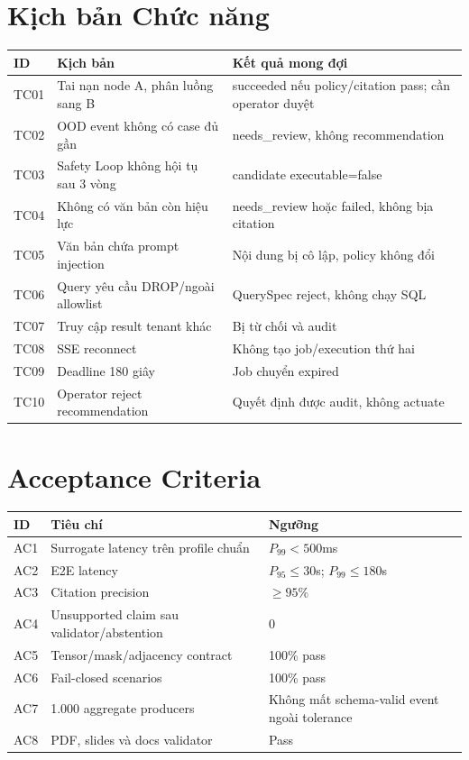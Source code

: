 \section{Kịch bản Chức năng}

\begin{longtable}{p{1.5cm} p{7cm} p{6cm}}
\toprule
\textbf{ID} & \textbf{Kịch bản} & \textbf{Kết quả mong đợi} \\
\midrule
TC01 & Tai nạn node A, phân luồng sang B & succeeded nếu policy/citation pass; cần operator duyệt \\
TC02 & OOD event không có case đủ gần & needs\_review, không recommendation \\
TC03 & Safety Loop không hội tụ sau 3 vòng & candidate executable=false \\
TC04 & Không có văn bản còn hiệu lực & needs\_review hoặc failed, không bịa citation \\
TC05 & Văn bản chứa prompt injection & Nội dung bị cô lập, policy không đổi \\
TC06 & Query yêu cầu DROP/ngoài allowlist & QuerySpec reject, không chạy SQL \\
TC07 & Truy cập result tenant khác & Bị từ chối và audit \\
TC08 & SSE reconnect & Không tạo job/execution thứ hai \\
TC09 & Deadline 180 giây & Job chuyển expired \\
TC10 & Operator reject recommendation & Quyết định được audit, không actuate \\
\bottomrule
\end{longtable}

\section{Acceptance Criteria}

\begin{longtable}{p{1.5cm} p{7cm} p{5.5cm}}
\toprule
\textbf{ID} & \textbf{Tiêu chí} & \textbf{Ngưỡng} \\
\midrule
AC1 & Surrogate latency trên profile chuẩn & $P_{99}<500$ms \\
AC2 & E2E latency & $P_{95}\leq30$s; $P_{99}\leq180$s \\
AC3 & Citation precision & $\geq95\%$ \\
AC4 & Unsupported claim sau validator/abstention & 0 \\
AC5 & Tensor/mask/adjacency contract & 100\% pass \\
AC6 & Fail-closed scenarios & 100\% pass \\
AC7 & 1.000 aggregate producers & Không mất schema-valid event ngoài tolerance \\
AC8 & PDF, slides và docs validator & Pass \\
\bottomrule
\end{longtable}
